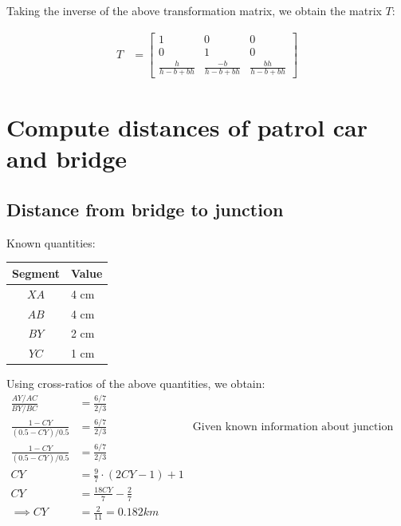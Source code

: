 \documentclass[12pt, oneside]{article}
\begin{document}
Taking the inverse of the above transformation matrix, we obtain the matrix $T$:

\begin{align*}
    T &=
    \begin{bmatrix}
      1             &  0   & 0 \\
      0             &  1   & 0 \\
      \frac{h}{h - b + bh}      &  
      \frac{-b}{h - b + bh}     & 
      \frac{bh}{h - b + bh}
      \end{bmatrix}
\end{align*}

\clearpage
\section{Compute distances of patrol car and bridge}

\subsection{Distance from bridge to junction}

Known quantities:

\begin{table}[H]
\centering
\begin{tabular}{|c|l|}
\hline
\textbf{Segment} & \textbf{Value}  \\ \hline
$XA$      & 4 cm     \\ \hline
$AB$      & 4 cm     \\ \hline
$BY$      & 2 cm     \\ \hline 
$YC$      & 1 cm     \\ \hline
\end{tabular}
\end{table}

Using cross-ratios of the above quantities, we obtain:
\begin{align*}
    \frac{AY/AC}{BY/BC}  &= \frac{6/7}{2/3} \\ 
    \frac{1-CY}{(0.5-CY)/0.5}  &= \frac{6/7}{2/3} &\text{Given known 
                                information about junction location}  \\ 
    \frac{1-CY}{(0.5-CY)/0.5}  &= \frac{6/7}{2/3} \\ 
    CY  &= \frac{9}{7} \cdot (2CY - 1) + 1  \\ 
    CY  &= \frac{18 CY}{7} - \frac{2}{7} \\
    \implies CY &=  \frac{2}{11} = 0.182 km 
\end{align*}
\end{document}
